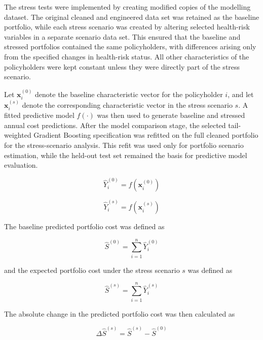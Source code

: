 	The stress tests were implemented by creating modified copies of the modelling dataset. The original cleaned and engineered data set was retained as the baseline portfolio, while each stress scenario was created by altering selected health-risk variables in a separate scenario data set. This ensured that the baseline and stressed portfolios contained the same policyholders, with differences arising only from the specified changes in health-risk status. All other characteristics of the policyholders were kept constant unless they were directly part of the stress scenario.
	
	Let \(\mathbf{x}_i^{(0)}\) denote the baseline characteristic vector for the policyholder \(i\), and let \(\mathbf{x}_i^{(s)}\) denote the corresponding characteristic vector in the stress scenario \(s\). A fitted predictive model \(f(\cdot)\) was then used to generate baseline and stressed annual cost predictions. After the model comparison stage, the selected tail-weighted Gradient Boosting specification was refitted on the full cleaned portfolio for the stress-scenario analysis. This refit was used only for portfolio scenario estimation, while the held-out test set remained the basis for predictive model evaluation.
	
	\begin{equation}
		\hat{Y}_i^{(0)} = f(\mathbf{x}_i^{(0)})
	\end{equation}
	
	\begin{equation}
		\hat{Y}_i^{(s)} = f(\mathbf{x}_i^{(s)})
	\end{equation}
	
	The baseline predicted portfolio cost was defined as
	
	\begin{equation}
		\hat{S}^{(0)} = \sum_{i=1}^{n} \hat{Y}_i^{(0)}
	\end{equation}
	
	and the expected portfolio cost under the stress scenario \(s\) was defined as
	
	\begin{equation}
		\hat{S}^{(s)} = \sum_{i=1}^{n} \hat{Y}_i^{(s)}
	\end{equation}
	
	The absolute change in the predicted portfolio cost was then calculated as
	
	\begin{equation}
		\Delta \hat{S}^{(s)} = \hat{S}^{(s)} - \hat{S}^{(0)}
	\end{equation}
	
